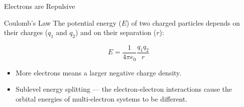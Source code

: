 \documentclass[handout]{beamer}
\begin{document}
%


\begin{frame}{Electrons are Repulsive}
	\begin{block}{Coulomb's Law}
		The potential energy ($E$) of two charged particles depends on
		their charges ($q_1$ and $q_2$) and on their separation ($r$):

		\begin{equation*}
			E = \frac{1}{4\pi e_0} \frac{q_1 q_2}{r}
		\end{equation*}
	\end{block}

	\begin{itemize}[<+->]
		\item More electrons means a larger negative charge density.
		\item \alert{Sublevel energy splitting} --- the electron-electron
			interactions cause the orbital energies of
			multi-electron systems to be different.
	\end{itemize}
\end{frame}
\end{document}
